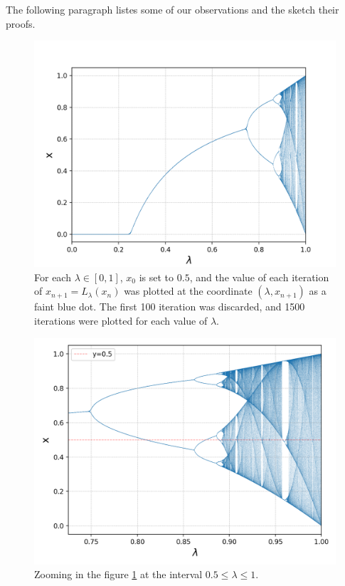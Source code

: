 The following paragraph listes some of our observations and the sketch their proofs.

\begin{figure}[htbp]
	\centering
	\includegraphics[width=\textwidth]{./figures/l_bifurcation_overview.png}
	\caption{For each $\lambda \in [0,1]$, $x_0$ is set to $0.5$, and the value of each iteration of $x_{n+1} = L_{\lambda}(x_n)$ was plotted at the coordinate $(\lambda, x_{n+1})$ as a faint blue dot. 
	The first 100 iteration was discarded, and 1500 iterations were plotted for each value of $\lambda$.}
	\label{fig:logistic bifurcation overview}
\end{figure}

\begin{figure}[htbp]
	\centering
	\includegraphics[width=\textwidth]{./figures/l_bifurcation_zoom_1.png}
	\caption{Zooming in the figure \ref{fig:logistic bifurcation overview} at the interval $0.5 \leq \lambda \leq 1$.}
	\label{fig:logistic_bifurcation_zoom_1}
\end{figure}


